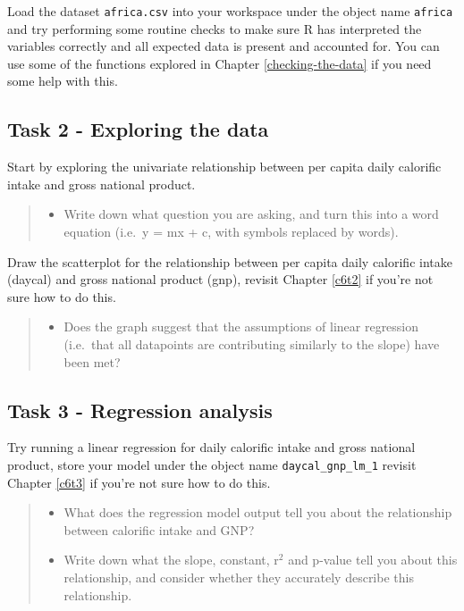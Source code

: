 \documentclass[
]{book}
\providecommand{\tightlist}{%
  \setlength{\itemsep}{0pt}\setlength{\parskip}{0pt}}
\begin{document}
Load the dataset \texttt{africa.csv} into your workspace under the object name \texttt{africa} and try performing some routine checks to make sure R has interpreted the variables correctly and all expected data is present and accounted for. You can use some of the functions explored in Chapter \ref{checking-the-data} if you need some help with this.

\hypertarget{task-2---exploring-the-data}{%
\subsection{Task 2 - Exploring the data}\label{task-2---exploring-the-data}}

Start by exploring the univariate relationship between per capita daily calorific intake and gross national product.

\begin{quote}
\begin{itemize}
\tightlist
\item
  Write down what question you are asking, and turn this into a word equation (i.e.~y = mx + c, with symbols replaced by words).
\end{itemize}
\end{quote}

Draw the scatterplot for the relationship between per capita daily calorific intake (daycal) and gross national product (gnp), revisit Chapter \ref{c6t2} if you're not sure how to do this.

\begin{quote}
\begin{itemize}
\tightlist
\item
  Does the graph suggest that the assumptions of linear regression (i.e.~that all datapoints are contributing similarly to the slope) have been met?
\end{itemize}
\end{quote}

\hypertarget{task-3---regression-analysis}{%
\subsection{Task 3 - Regression analysis}\label{task-3---regression-analysis}}

Try running a linear regression for daily calorific intake and gross national product, store your model under the object name \texttt{daycal\_gnp\_lm\_1} revisit Chapter \ref{c6t3} if you're not sure how to do this.

\begin{quote}
\begin{itemize}
\tightlist
\item
  What does the regression model output tell you about the relationship between calorific intake and GNP?
\item
  Write down what the slope, constant, r\(^2\) and p-value tell you about this relationship, and consider whether they accurately describe this relationship.
\end{itemize}
\end{quote}
\end{document}

